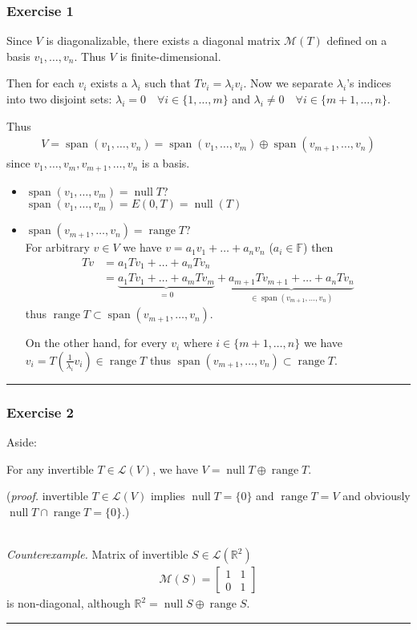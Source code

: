 \documentclass[12pt, letterpaper]{scrartcl}
\newcommand{\R}{\mathbb{R}}
\newcommand{\F}{\mathbb{F}}
\DeclareMathOperator{\Span}{span}
\DeclareMathOperator{\Null}{null}
\DeclareMathOperator{\Range}{range}
\begin{document}
\subsubsection*{Exercise 1}
Since $V$ is diagonalizable, there exists a diagonal matrix $\mathcal{M}(T)$ defined on a basis $v_1, \dots, v_n$. Thus $V$ is finite-dimensional.

Then for each $v_i$ exists a $\lambda_i$ such that $Tv_i=\lambda_iv_i$. Now we separate $\lambda_i$'s indices into two disjoint sets: $\lambda_i=0 \quad\forall i\in\{1,\dots, m\}$ and $\lambda_i\neq0 \quad\forall i\in\{m+1,\dots, n\}$.

 Thus 
\begin{align*}
    V=\Span(v_1,\dots,v_n)=\Span(v_1,\dots,v_m)\oplus \Span(v_{m+1},\dots,v_n)
\end{align*}
since $v_1, \dots, v_m, v_{m+1}, \dots, v_n$ is a basis. 
\begin{itemize}
    \item {\color{purple}$\Span(v_1,\dots,v_m)=\Null T$?}\\
    $\Span(v_1,\dots,v_m)=E(0,T)=\Null(T)$

    \item {\color{purple}$\Span(v_{m+1},\dots,v_n)=\Range T$?}\\
    For arbitrary $v\in V$ we have $v=a_1v_1+\dots+a_nv_n$ ($a_i\in \F$) then
    \begin{align*}
        Tv&=a_1Tv_1+\dots+a_nTv_n\\
        &=\underbrace{a_{1}Tv_{1}+\dots+a_mTv_m}_{=0}+\underbrace{a_{m+1}Tv_{m+1}+\dots+a_nTv_n}_{\in \Span(v_{m+1},\dots,v_n)}
    \end{align*}
    thus $\Range T\subset \Span(v_{m+1},\dots,v_n)$.
    
    On the other hand, for every $v_i$ where $i\in \{m+1, \dots, n\}$ we have $v_i=T(\frac{1}{\lambda_i}v_i)\in \Range T$ thus $\Span(v_{m+1},\dots,v_n) \subset\Range T$.
    
\end{itemize}
\vskip1mm\hrule


\subsubsection*{Exercise 2}
{\color{teal} Aside:

For any invertible $T\in\mathcal{L}(V)$, we have $V=\Null T\oplus\Range T$.

(\emph{proof.} invertible $T\in\mathcal{L}(V)$ implies $\Null T=\{0\}$ and $\Range T=V$ and obviously $\Null T\cap \Range T=\{0\}.$)
}\\
{\color{purple}\emph{Counterexample.}} Matrix of invertible $S\in\mathcal{L}(\R^2)$
\begin{align*}
    \mathcal{M}(S)= 
    \left[ 
    \begin{array}{cc}
        1 & 1\\ 0 & 1
    \end{array} 
    \right]
\end{align*}
is non-diagonal, although $\R^2=\Null S \oplus \Range S$.
\vskip1mm\hrule
\end{document}
